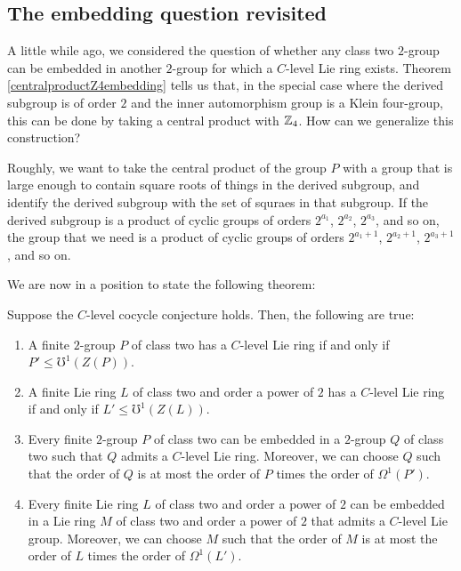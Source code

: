 \documentclass[10pt]{amsart}
\begin{document}
\subsection{The embedding question revisited}

A little while ago, we considered the question of whether any class
two $2$-group can be embedded in another $2$-group for which a
$C$-level Lie ring exists. Theorem \ref{centralproductZ4embedding}
tells us that, in the special case where the derived subgroup is of
order $2$ and the inner automorphism group is a Klein four-group, this
can be done by taking a central product with $\mathbb{Z}_4$. How can we
generalize this construction?

Roughly, we want to take the central product of the group $P$ with a
group that is large enough to contain square roots of things in the
derived subgroup, and identify the derived subgroup with the set of
squraes in that subgroup. If the derived subgroup is a product of
cyclic groups of orders $2^{a_1}$, $2^{a_2}$, $2^{a_3}$, and so on,
the group that we need is a product of cyclic groups of orders $2^{a_1
+ 1}$, $2^{a_2 + 1}$, $2^{a_3 + 1}$, and so on.

We are now in a position to state the following theorem:

\begin{theorem}\label{clevelcocyclecorollaries}
  Suppose the $C$-level cocycle conjecture holds. Then, the following
  are true:

  \begin{enumerate}
  \item A finite $2$-group $P$ of class two has a $C$-level Lie ring
    if and only if $P' \le \mho^1(Z(P))$.
  \item A finite Lie ring $L$ of class two and order a power of $2$
    has a $C$-level Lie ring if and only if $L' \le \mho^1(Z(L))$.
  \item Every finite $2$-group $P$ of class two can be embedded in a
    $2$-group $Q$ of class two such that $Q$ admits a $C$-level Lie
    ring. Moreover, we can choose $Q$ such that the order of $Q$ is
    at most the order of $P$ times the order of $\Omega^1(P')$.
  \item Every finite Lie ring $L$ of class two and order a power of
    $2$ can be embedded in a Lie ring $M$ of class two and order a
    power of $2$ that admits a $C$-level Lie group. Moreover, we can
    choose $M$ such that the order of $M$ is at most the order of $L$
    times the order of $\Omega^1(L')$.
  \end{enumerate}
\end{theorem}
\end{document}
